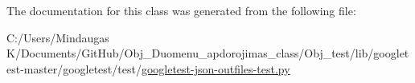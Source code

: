 The documentation for this class was generated from the following file\+:\begin{DoxyCompactItemize}
\item 
C\+:/\+Users/\+Mindaugas K/\+Documents/\+Git\+Hub/\+Obj\+\_\+\+Duomenu\+\_\+apdorojimas\+\_\+class/\+Obj\+\_\+test/lib/googletest-\/master/googletest/test/\mbox{\hyperlink{_obj__test_2lib_2googletest-master_2googletest_2test_2googletest-json-outfiles-test_8py}{googletest-\/json-\/outfiles-\/test.\+py}}\end{DoxyCompactItemize}
